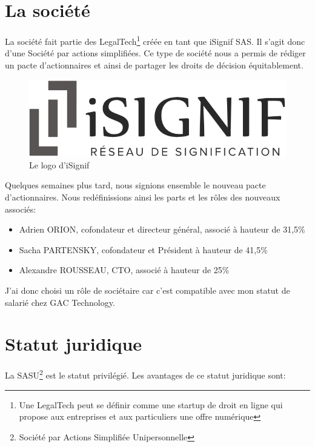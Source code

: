 \documentclass[]{report}
\begin{document}
  \section{La société}

    La société fait partie des LegalTech\footnote{Une LegalTech peut se définir comme une startup de droit en ligne qui propose aux entreprises et aux particuliers une offre numérique} créée en tant que iSignif SAS. Il s'agit donc d'une Société par actions simplifiées. Ce type de société nous a permis de rédiger un pacte d'actionnaires et ainsi de partager les droits de décision équitablement.

    \begin{figure}
      \includegraphics[width=\linewidth]{img/logo.png}
      \caption{Le logo d'iSignif}
    \end{figure}

    Quelques semaines plus tard, nous signions ensemble le nouveau pacte d'actionnaires. Nous redéfinissions ainsi les parts et les rôles des nouveaux associés:

    \begin{itemize}
      \item Adrien ORION, cofondateur et directeur général, associé à hauteur de 31,5\%
      \item Sacha PARTENSKY, cofondateur et Président à hauteur de 41,5\%
      \item Alexandre ROUSSEAU, CTO, associé à hauteur de 25\%
    \end{itemize}

    J'ai donc choisi un rôle de sociétaire car c'est compatible avec mon statut de salarié chez GAC Technology.

  \section{Statut juridique}


    La SASU\footnote{Société par Actions Simplifiée Unipersonnelle} est le statut privilégié. Les avantages de ce statut juridique sont:
\end{document}
